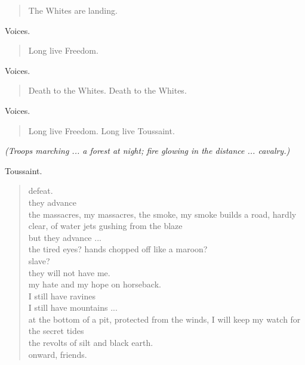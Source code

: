 \documentclass[letterpaper,article,12pt,oneside,notitlepage]{memoir}
\begin{document}
\begin{verse}
\hspace{1cm} The Whites are landing. \\
\end{verse}

\begin{center}Voices.\end{center}

\begin{verse}
\hspace{1cm} Long live Freedom. \\
\end{verse}

\begin{center}Voices.\end{center}

\begin{verse}
\hspace{1cm} Death to the Whites. Death to the Whites. \\
\end{verse}

\begin{center}Voices.\end{center}

\begin{verse}
\hspace{1cm} Long live Freedom. Long live Toussaint. \\
\end{verse}

\textit{(Troops marching ... a forest at night; fire glowing in the distance ... cavalry.)}

\clearpage

\begin{center}Toussaint.\end{center}

\begin{verse}
defeat. \\
they advance \\
the massacres, my massacres, the smoke, my smoke builds a road, hardly clear, of water jets gushing from the blaze \\
but they advance ... \\
the tired eyes? hands chopped off like a maroon? \\
slave? \\
they will not have me. \\
my hate and my hope on horseback. \\
I still have ravines \\
I still have mountains ... \\
at the bottom of a pit, protected from the winds, I will keep my watch for the secret tides \\
the revolts of silt and black earth. \\
onward, friends. \\
\end{verse}
\end{document}
